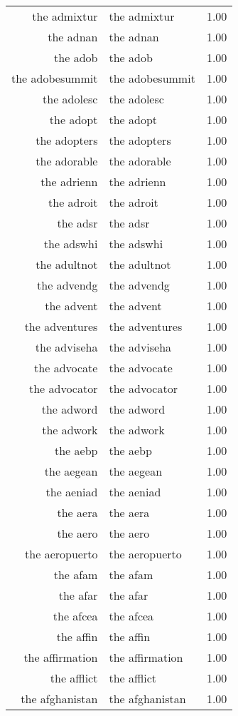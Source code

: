 \begin{table}[ht]
\begin{tabular}{rlr}
  the admixtur & the admixtur & 1.00 \\ 
  the adnan & the adnan & 1.00 \\ 
  the adob & the adob & 1.00 \\ 
  the adobesummit & the adobesummit & 1.00 \\ 
  the adolesc & the adolesc & 1.00 \\ 
  the adopt & the adopt & 1.00 \\ 
  the adopters & the adopters & 1.00 \\ 
  the adorable & the adorable & 1.00 \\ 
  the adrienn & the adrienn & 1.00 \\ 
  the adroit & the adroit & 1.00 \\ 
  the adsr & the adsr & 1.00 \\ 
  the adswhi & the adswhi & 1.00 \\ 
  the adultnot & the adultnot & 1.00 \\ 
  the advendg & the advendg & 1.00 \\ 
  the advent & the advent & 1.00 \\ 
  the adventures & the adventures & 1.00 \\ 
  the adviseha & the adviseha & 1.00 \\ 
  the advocate & the advocate & 1.00 \\ 
  the advocator & the advocator & 1.00 \\ 
  the adword & the adword & 1.00 \\ 
  the adwork & the adwork & 1.00 \\ 
  the aebp & the aebp & 1.00 \\ 
  the aegean & the aegean & 1.00 \\ 
  the aeniad & the aeniad & 1.00 \\ 
  the aera & the aera & 1.00 \\ 
  the aero & the aero & 1.00 \\ 
  the aeropuerto & the aeropuerto & 1.00 \\ 
  the afam & the afam & 1.00 \\ 
  the afar & the afar & 1.00 \\ 
  the afcea & the afcea & 1.00 \\ 
  the affin & the affin & 1.00 \\ 
  the affirmation & the affirmation & 1.00 \\ 
  the afflict & the afflict & 1.00 \\ 
  the afghanistan & the afghanistan & 1.00 \\ 

\end{tabular}
\end{table}
